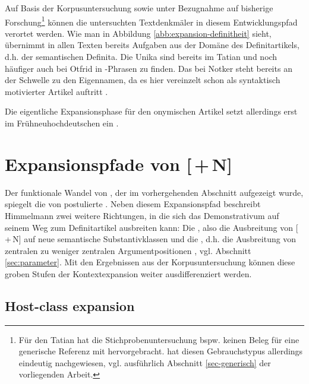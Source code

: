 Auf Basis der Korpusuntersuchung sowie unter Bezugnahme auf bisherige Forschung\footnote{Für den Tatian hat die Stichprobenuntersuchung bspw. keinen Beleg für eine generische Referenz mit  hervorgebracht. \textcite{Oubouzar1992} hat diesen Gebrauchstypus allerdings eindeutig nachgewiesen, vgl. ausführlich Abschnitt \ref{sec-generisch} der vorliegenden Arbeit.} können die untersuchten Textdenkmäler in diesem Entwicklungspfad verortet werden. Wie man in Abbildung \ref{abb:expansion-definitheit} sieht, übernimmt   in allen Texten bereits Aufgaben aus der Domäne des Definitartikels, d.h. der semantischen Definita. Die Unika sind bereits im Tatian und noch häufiger auch bei Otfrid in -Phrasen zu finden. Das  bei Notker steht bereits an der Schwelle zu den Eigennamen, da es hier vereinzelt schon als syntaktisch motivierter Artikel auftritt \parencite[ , s.][638]{Oubouzar1989}.

Die eigentliche Expansionsphase für den onymischen Artikel setzt allerdings erst im Frühneuhochdeutschen ein \parencite{Schmuck2020}. 


\section{Expansionspfade von [\,+\,N]} \label{sec:disk-expansion}

Der funktionale Wandel von , der im vorhergehenden Abschnitt aufgezeigt wurde, spiegelt die von \textcite[32--33]{Himmelmann2004} postulierte . Neben diesem Expansionspfad beschreibt Himmelmann zwei weitere Richtungen, in die sich das Demonstrativum auf seinem Weg zum Definitartikel ausbreiten kann: Die , also die Ausbreitung von [\,+\,N] auf neue semantische Substantivklassen und die , d.h. die Ausbreitung von zentralen zu weniger zentralen Argumentpositionen \parencite[32--33]{Himmelmann2004}, vgl. Abschnitt \ref{sec:parameter}. Mit den Ergebnissen aus der Korpusuntersuchung können diese groben Stufen der Kontextexpansion weiter ausdifferenziert werden.  

\subsection{Host-class expansion}

